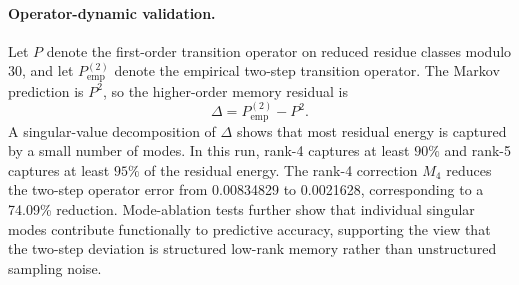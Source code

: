 
\paragraph{Operator-dynamic validation.}
Let \(P\) denote the first-order transition operator on reduced residue classes modulo \(30\), and let
\(P^{(2)}_{\mathrm{emp}}\) denote the empirical two-step transition operator.  The Markov prediction is
\(P^2\), so the higher-order memory residual is
\[
\Delta = P^{(2)}_{\mathrm{emp}} - P^2 .
\]
A singular-value decomposition of \(\Delta\) shows that most residual energy is captured by a small
number of modes.  In this run, rank-4 captures at least \(90\%\) and rank-5 captures at least
\(95\%\) of the residual energy.  The rank-4 correction \(M_4\) reduces the two-step operator error
from 0.00834829 to 0.0021628, corresponding to a 74.09\% reduction.  Mode-ablation tests further show that
individual singular modes contribute functionally to predictive accuracy, supporting the view that
the two-step deviation is structured low-rank memory rather than unstructured sampling noise.
